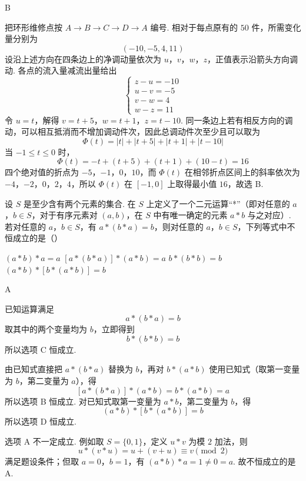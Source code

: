 \begin{answer}
B
\end{answer}

\begin{solution}
把环形维修点按 \(A\to B\to C\to D\to A\) 编号. 相对于每点原有的 \(50\) 件，所需变化量分别为
\[
(-10,-5,4,11)
\]
设沿上述方向在四条边上的净调动量依次为 \(u\)，\(v\)，\(w\)，\(z\)，正值表示沿箭头方向调动. 各点的流入量减流出量给出
\[
\begin{cases}
z-u=-10\\
u-v=-5\\
v-w=4\\
w-z=11
\end{cases}
\]
令 \(u=t\)，解得 \(v=t+5\)，\(w=t+1\)，\(z=t-10\).
同一条边上若有相反方向的调动，可以相互抵消而不增加调动件次，因此总调动件次至少且可以取为
\[
\Phi(t)=|t|+|t+5|+|t+1|+|t-10|
\]
当 \(-1\leqslant t\leqslant0\) 时，
\[
\Phi(t)=-t+(t+5)+(t+1)+(10-t)=16
\]
四个绝对值的折点为 \(-5\)，\(-1\)，\(0\)，\(10\)，而 \(\Phi(t)\) 在相邻折点区间上的斜率依次为 \(-4\)，\(-2\)，\(0\)，\(2\)，\(4\)，所以 \(\Phi(t)\) 在 \([-1,0]\) 上取得最小值 \(16\)，故选 B.
\end{solution}

\begin{problem}
设 \(S\) 是至少含有两个元素的集合. 在 \(S\) 上定义了一个二元运算“*”（即对任意的 \(a\)，\(b \in S\)，对于有序元素对 \((a, b)\)，在 \(S\) 中有唯一确定的元素 \(a*b\) 与之对应）. 若对任意的 \(a\)，\(b \in S\)，有 \(a*(b*a)=b\)，则对任意的 \(a\)，\(b \in S\)，下列等式中不恒成立的是（\quad）

\choices
    {\((a*b)*a = a\)}
    {\([a * (b * a)] * (a * b) = a\)}
    {\( b*(b*b)=b \)}
    {\((a*b)*[b*(a*b)] = b\)}
\end{problem}

\begin{answer}
A
\end{answer}

\begin{solution}
已知运算满足
\[
a\ast(b\ast a)=b
\]
取其中的两个变量均为 \(b\)，立即得到
\[
b\ast(b\ast b)=b
\]
所以选项 C 恒成立.

由已知式直接把 \(a\ast(b\ast a)\) 替换为 \(b\)，再对 \(b\ast(a\ast b)\) 使用已知式（取第一变量为 \(b\)，第二变量为 \(a\)），得
\[
[a\ast(b\ast a)]\ast(a\ast b)=b\ast(a\ast b)=a
\]
所以选项 B 恒成立. 对已知式取第一变量为 \(a\ast b\)，第二变量为 \(b\)，得
\[
(a\ast b)\ast[b\ast(a\ast b)]=b
\]
所以选项 D 恒成立.

选项 A 不一定成立. 例如取 \(S=\{0,1\}\)，定义 \(u\ast v\) 为模 \(2\) 加法，则
\[
u\ast(v\ast u)=u+(v+u)\equiv v\pmod 2
\]
满足题设条件；但取 \(a=0\)，\(b=1\)，有 \((a\ast b)\ast a=1\ne0=a\). 故不恒成立的是 A.
\end{solution}

